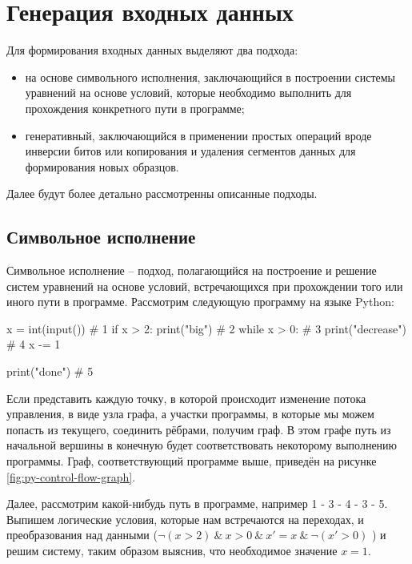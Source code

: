 \section{Генерация входных данных}

Для формирования входных данных выделяют два подхода:

\begin{itemize}
	
	\item на основе символьного исполнения, заключающийся в построении системы уравнений на основе условий, которые необходимо выполнить для прохождения конкретного пути в программе;
	
	\item генеративный, заключающийся в применении простых операций вроде инверсии битов или копирования и удаления сегментов данных для формирования новых образцов.
	
\end{itemize}

Далее будут более детально рассмотренны описанные подходы.

\subsection{Символьное исполнение}

Символьное исполнение -- подход, полагающийся на построение и решение систем уравнений на основе условий, встречающихся при прохождении того или иного пути в программе. Рассмотрим следующую программу на языке Python:
\begin{code}
x = int(input())      # 1
if x > 2:
    print("big")      # 2
while x > 0:          # 3
   print("decrease")  # 4
   x -= 1

print("done")         # 5
\end{code}
Если представить каждую точку, в которой происходит изменение потока управления, в виде узла графа, а участки программы, в которые мы можем попасть из текущего, соединить рёбрами, получим граф. В этом графе путь из начальной вершины в конечную будет соответствовать некоторому выполнению программы. Граф, соответствующий программе выше, приведён на рисунке \ref{fig:py-control-flow-graph}.

Далее, рассмотрим какой-нибудь путь в программе, например 1 - 3 - 4 - 3 - 5. Выпишем логические условия, которые нам встречаются на переходах, и преобразования над данными ($\neg (x > 2) \ \& \ x > 0 \ \& \ x'=x \ \& \ \neg (x'>0) $ ) и решим систему, таким образом выяснив, что необходимое значение $x = 1$.

